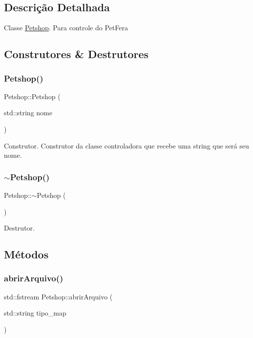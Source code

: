 \subsection{Descrição Detalhada}
Classe \hyperlink{classPetshop}{Petshop}. Para controle do Pet\+Fera 

\subsection{Construtores \& Destrutores}
\mbox{\label{classPetshop_a6ea911ff6ce0a63275d33db172086f69}} 
\subsubsection{\texorpdfstring{Petshop()}{Petshop()}}
{\footnotesize\ttfamily Petshop\+::\+Petshop (\begin{DoxyParamCaption}\item[{std\+::string}]{nome }\end{DoxyParamCaption})}

Construtor. Construtor da classe controladora que recebe uma string que será seu nome. \mbox{\label{classPetshop_a3ec4d2ba5d85e86d63121b4efd199de2}} 
\subsubsection{\texorpdfstring{$\sim$\+Petshop()}{~Petshop()}}
{\footnotesize\ttfamily Petshop\+::$\sim$\+Petshop (\begin{DoxyParamCaption}{ }\end{DoxyParamCaption})}

Destrutor. 

\subsection{Métodos}
\mbox{\label{classPetshop_a3e0c8fc8c46784fcd0bc7d650ba7dcec}} 
\subsubsection{\texorpdfstring{abrir\+Arquivo()}{abrirArquivo()}}
{\footnotesize\ttfamily std\+::fstream Petshop\+::abrir\+Arquivo (\begin{DoxyParamCaption}\item[{std\+::string}]{tipo\+\_\+map }\end{DoxyParamCaption})}


